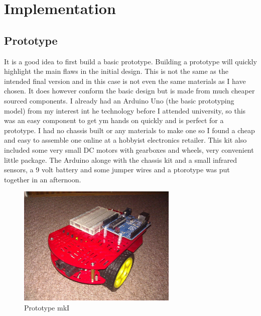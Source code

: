\chapter{Implementation}



\section{Prototype}
It is a good idea to first build a basic prototype.  Building a prototype will quickly highlight the main flaws in the initial design.  This is not the same as the intended final version and in this case is not even the same materials as I have chosen.  It does however conform the basic design but is made from much cheaper sourced components.  I already had an Arduino Uno (the basic prototyping model) from my interest int he technology before I attended university, so this was an easy component to get ym hands on quickly and is perfect for a prototype.  I had no chassis built or any materials to make one so I found a cheap and easy to assemble one online at a hobbyist electronics retailer.  This kit also included some very small DC motors with gearboxes and wheels, very convenient little package.  The Arduino alonge with the chassis kit and a small infrared sensors, a 9 volt battery and some jumper wires and a ptorotype was put together in an afternoon.
\begin{figure}[h]
\centering
        \includegraphics[width=3.0in] {Images/tria-mkI.jpg}
        \caption{Prototype mkI}
        \label{Prototype mkI}
\end{figure}

